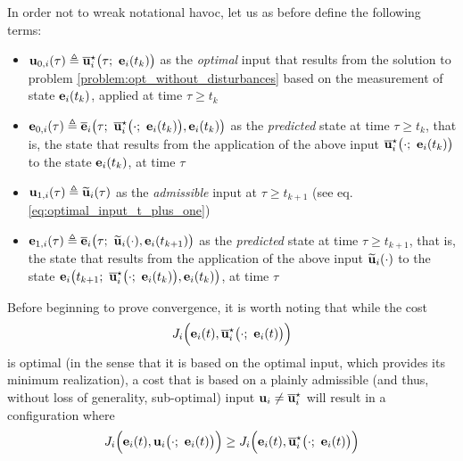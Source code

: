 In order not to wreak notational havoc, let us as  before define the following
terms:
\begin{gg_box}
\begin{itemize}
  \item $\bm{\mathbf{u}}_{0,i}(\tau) \triangleq \overline{\bm{\mathbf{u}}}_i^{\star}\big(\tau;\ \bm{\mathbf{e}}_i(t_k)\big)$
    as the \textit{optimal} input that results from the solution to problem
    \eqref{problem:opt_without_disturbances} based on the measurement of state
    $\bm{\mathbf{e}}_i(t_k)$, applied at time $\tau \geq t_k$
  \item $\vect{e}_{0,i}(\tau) \triangleq \overline{\vect{e}}_i\big(\tau;\ \overline{\vect{u}}_i^{\star}\big(\cdot;\ \vect{e}_i(t_k)\big), \vect{e}_i(t_k)\big)$
    as the \textit{predicted} state at time $\tau \geq t_k$, that is,
    the state that results from the application of the above input
    $\overline{\vect{u}}_i^{\star}\big(\cdot;\ \vect{e}_i(t_k)\big)$ to the
    state $\bm{\mathbf{e}}_i(t_k)$, at time $\tau$
  \item $\bm{\mathbf{u}}_{1,i}(\tau) \triangleq \widetilde{\bm{\mathbf{u}}}_i(\tau)$
    as the \textit{admissible} input at $\tau \geq t_{k+1}$ (see eq. \eqref{eq:optimal_input_t_plus_one})
  \item $\bm{\mathbf{e}}_{1,i}(\tau) \triangleq \overline{\bm{\mathbf{e}}}_i\big(\tau;\ \widetilde{\bm{\mathbf{u}}}_i(\cdot), \bm{\mathbf{e}}_i(t_{k+1})\big)$
    as the \textit{predicted} state at time $\tau \geq t_{k+1}$, that is,
    the state that results from the application of the above input
    $\widetilde{\bm{\mathbf{u}}}_i(\cdot)$ to the state
    $\vect{e}_i\big(t_{k+1};\ \overline{\vect{u}}_i^{\star}\big(\cdot;\ \vect{e}_i(t_k)\big), \vect{e}_i(t_k)\big)$, at time $\tau$
\end{itemize}
\end{gg_box}





Before beginning to prove convergence, it is worth noting that while the cost
$$J_i \Big(\vect{e}_i(t), \overline{\vect{u}}_i^{\star}\big(\cdot;\ \vect{e}_i(t)\big)\Big)$$
is optimal (in the sense that it is based on the optimal input, which provides
its minimum realization), a cost that is based on a plainly admissible
(and thus, without loss of generality, sub-optimal) input
$\bm{\mathbf{u}}_i \not= \overline{\bm{\mathbf{u}}}_i^{\star}$ will result in a configuration where
\begin{equation}
J_i \Big(\vect{e}_i(t), \vect{u}_i\big(\cdot;\ \vect{e}_i(t)\big)\Big)
\geq J_i \Big(\vect{e}_i(t), \overline{\vect{u}}_i^{\star}\big(\cdot;\ \vect{e}_i(t)\big)\Big)
\end{equation}

